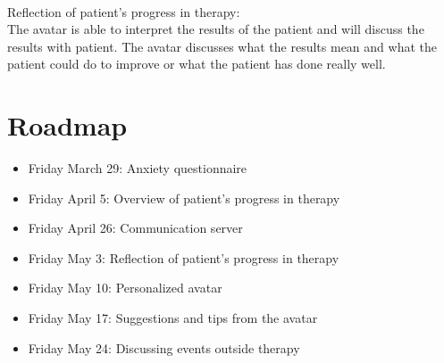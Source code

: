 \paragraph{}
Reflection of patient's progress in therapy: \\
The avatar is able to interpret the results of the patient and will discuss the results with patient. The avatar discusses what the results mean and what the patient could do to improve or what the patient has done really well.

\section{Roadmap}
\begin{itemize}
\item Friday March 29: Anxiety questionnaire	
\item Friday April 5: Overview of patient's progress in therapy
\item Friday April 26: Communication server
\item Friday May 3: Reflection of patient's progress in therapy
\item Friday May 10: Personalized avatar
\item Friday May 17: Suggestions and tips from the avatar	
\item Friday May 24: Discussing events outside therapy
\end{itemize}
